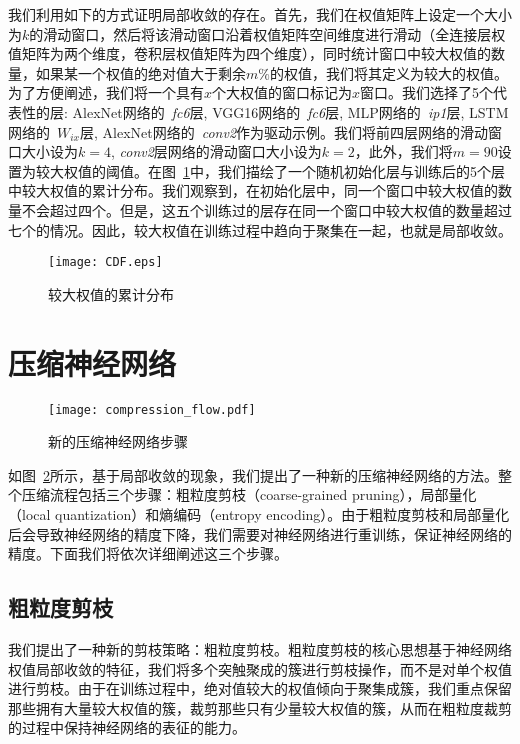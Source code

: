我们利用如下的方式证明局部收敛的存在。首先，我们在权值矩阵上设定一个大小为$k$的滑动窗口，然后将该滑动窗口沿着权值矩阵空间维度进行滑动（全连接层权值矩阵为两个维度，卷积层权值矩阵为四个维度），同时统计窗口中较大权值的数量，如果某一个权值的绝对值大于剩余$m\%$的权值，我们将其定义为较大的权值。为了方便阐述，我们将一个具有$x$个大权值的窗口标记为$x$窗口。我们选择了5个代表性的层: AlexNet网络的~\emph{fc6}层, VGG16网络的~\emph{fc6}层, MLP网络的~\emph{ip1}层, LSTM网络的~\emph{$W_{ix}$}层, AlexNet网络的~\emph{conv2}作为驱动示例。我们将前四层网络的滑动窗口大小设为$k = 4$, \emph{conv2}层网络的滑动窗口大小设为$k = 2$，此外，我们将$m = 90$设置为较大权值的阈值。在图~\ref{fig:cdf}中，我们描绘了一个随机初始化层与训练后的5个层中较大权值的累计分布。我们观察到，在初始化层中，同一个窗口中较大权值的数量不会超过四个。但是，这五个训练过的层存在同一个窗口中较大权值的数量超过七个的情况。因此，较大权值在训练过程中趋向于聚集在一起，也就是局部收敛。

\begin{figure}[h]
\centering
\texttt{[image: CDF.eps]}
\caption{较大权值的累计分布}
\label{fig:cdf}
\end{figure}

\section{压缩神经网络}

\begin{figure}[h]
\centering
\texttt{[image: compression\_flow.pdf]}
\caption{新的压缩神经网络步骤}
\label{fig:compression_flow}
\end{figure}

如图~\ref{fig:compression_flow}所示，基于局部收敛的现象，我们提出了一种新的压缩神经网络的方法。整个压缩流程包括三个步骤：粗粒度剪枝（coarse-grained pruning），局部量化（local quantization）和熵编码（entropy encoding）。由于粗粒度剪枝和局部量化后会导致神经网络的精度下降，我们需要对神经网络进行重训练，保证神经网络的精度。下面我们将依次详细阐述这三个步骤。


\subsection{粗粒度剪枝}

我们提出了一种新的剪枝策略：粗粒度剪枝。粗粒度剪枝的核心思想基于神经网络权值局部收敛的特征，我们将多个突触聚成的簇进行剪枝操作，而不是对单个权值进行剪枝。由于在训练过程中，绝对值较大的权值倾向于聚集成簇，我们重点保留那些拥有大量较大权值的簇，裁剪那些只有少量较大权值的簇，从而在粗粒度裁剪的过程中保持神经网络的表征的能力。

